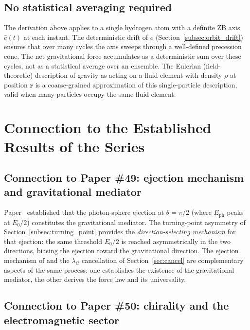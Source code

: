 \documentclass[%
 reprint, amsmath,amssymb, aps, prb, ]{revtex4-2}
\numberwithin{equation}{section}
\newcommand{\iphase}{\theta}
\newcommand{\lambdaC}{\lambda_{\mathrm{C}}}
\begin{document}
\subsection{No statistical averaging required}
\label{subsec:no_average}

The derivation above applies to a single hydrogen atom with a definite ZB axis $\hat{e}(t)$ at each instant. The deterministic drift of $\hat{e}$ (Section~\ref{subsec:orbit_drift}) ensures that over many cycles the axis sweeps through a well-defined precession cone. The net gravitational force accumulates as a deterministic sum over these cycles, not as a statistical average over an ensemble. The Eulerian (field-theoretic) description of gravity as acting on a fluid element with density $\rho$ at position $\mathbf{r}$ is a coarse-grained approximation of this single-particle description, valid when many particles occupy the same fluid element.

\section{Connection to the Established Results of the Series}
\label{sec:connections}

\subsection{Connection to Paper \#49: ejection mechanism and gravitational mediator}
\label{subsec:p49}

Paper~\cite{hanamura49} established that the photon-sphere ejection at $\iphase = \pi/2$ (where $E_\mathrm{ph}$ peaks at $E_0/2$) constitutes the gravitational mediator. The turning-point asymmetry of Section~\ref{subsec:turning_point} provides the \emph{direction-selecting mechanism} for that ejection: the same threshold $E_0/2$ is reached asymmetrically in the two directions, biasing the ejection toward the gravitational direction. The ejection mechanism of \cite{hanamura49} and the $\lambdaC$ cancellation of Section~\ref{sec:cancel} are complementary aspects of the same process: one establishes the existence of the gravitational mediator, the other derives the force law and its universality.

\subsection{Connection to Paper \#50: chirality and the electromagnetic sector}
\label{subsec:p50}
\end{document}
